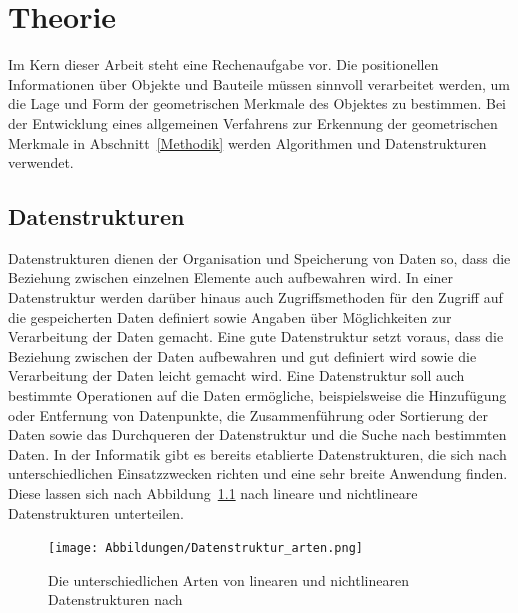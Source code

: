 %	
%		
% 		

\chapter{Theorie}
Im Kern dieser Arbeit steht eine Rechenaufgabe vor. Die positionellen Informationen über Objekte und Bauteile müssen sinnvoll verarbeitet werden, um die Lage und Form der geometrischen Merkmale des Objektes zu bestimmen. Bei der Entwicklung eines allgemeinen Verfahrens zur Erkennung der geometrischen Merkmale in Abschnitt~\ref{Methodik} werden Algorithmen und Datenstrukturen verwendet. 

\section{Datenstrukturen} \label{Datenstrukturen}

Datenstrukturen dienen der Organisation und Speicherung von Daten so, dass die Beziehung zwischen einzelnen Elemente auch aufbewahren wird. In einer Datenstruktur werden darüber hinaus auch Zugriffsmethoden für den Zugriff auf die gespeicherten Daten definiert sowie Angaben über Möglichkeiten zur Verarbeitung der Daten gemacht. Eine gute Datenstruktur setzt voraus, dass die Beziehung zwischen der Daten aufbewahren und gut definiert wird sowie die Verarbeitung der Daten leicht gemacht wird. Eine Datenstruktur soll auch bestimmte Operationen auf die Daten ermögliche, beispielsweise die Hinzufügung oder Entfernung von Datenpunkte, die Zusammenführung oder Sortierung der Daten sowie das Durchqueren der Datenstruktur und die Suche nach bestimmten Daten. In der Informatik gibt es bereits etablierte Datenstrukturen, die sich nach unterschiedlichen Einsatzzwecken richten und eine sehr breite Anwendung finden. Diese lassen sich nach Abbildung~\ref{fig: datastructures} nach lineare und nichtlineare Datenstrukturen unterteilen. \autocite[1-2]{mohanty_data_2021}

\begin{figure}[h]
	\texttt{[image: Abbildungen/Datenstruktur\_arten.png]}
	\centering
	\caption[Datenstrukturarten]{Die unterschiedlichen Arten von linearen und nichtlinearen Datenstrukturen nach \textcite[2]{mohanty_data_2021}}
	\label{fig: datastructures}
\end{figure}

